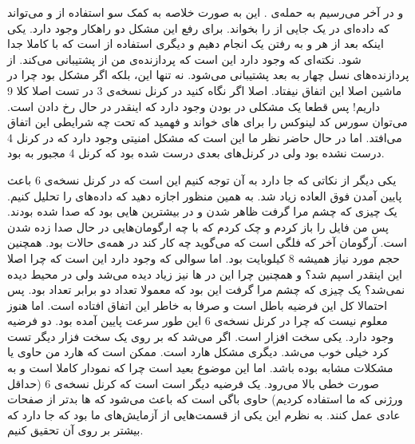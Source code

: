 و در آخر می‌رسیم به حمله‌ی
.
این به صورت خلاصه به کمک سو استفاده از
 و 
می‌تواند که داده‌ای در یک جایی از
را بخواند. برای رفع این مشکل دو راهکار وجود دارد. یکی اینکه بعد از هر
 و  به 
رفتن یک
انجام دهیم و دیگری استفاده از
است که
 با 
کاملا جدا شود. نکته‌ای که وجود دارد این است که پردازنده‌ی من از
پشتیبانی می‌کند.
از پردازنده‌های نسل چهار به بعد پشتیبانی می‌شود. نه تنها این، بلکه اگر مشکل
بود چرا در ماشین
اصلا این اتفاق نیفتاد. اصلا اگر نگاه کنید در کرنل نسخه‌ی 3 در تست
اصلا کلا 9
داریم! پس قطعا یک مشکلی در
بودن وجود دارد که اینقدر
در حال رخ دادن است. می‌توان سورس کد لینوکس را برای
های 
خواند و فهمید که تحت چه شرایطی این اتفاق می‌افتد. اما در حال حاضر نظر ما این است که مشکل امنیتی
وجود دارد که در کرنل 4 درست نشده بود ولی در کرنل‌های بعدی درست شده بود که کرنل 4 مجبور به
بود.

یکی دیگر از نکاتی که جا دارد به آن توجه کنیم این است که
در کرنل نسخه‌ی 6 باعث پایین آمدن فوق العاده زیاد
شد. به همین منظور اجازه دهید که داده‌های
را تحلیل کنیم. یک چیزی که چشم مرا گرفت ظاهر شدن
 و 
در بیشترین
هایی
بود که صدا شده بودند. پس من فایل
را باز کردم و چک کردم که
با چه ارگومان‌هایی در حال صدا زده شدن است. آرگومان آخر که فلگی است که می‌گوید چه کار کند در همه‌ی حالات
بود. همچنین حجم
مورد نیاز همیشه 8 کیلوبایت بود. اما سوالی که وجود دارد این است که چرا اصلا این
اینقدر اسپم شد؟ و همچنین چرا این
در
ها
نیز زیاد دیده می‌شد ولی در محیط
دیده نمی‌شد؟ یک چیزی که چشم مرا گرفت این بود که معمولا تعداد
دو برابر تعداد
بود. پس احتمالا کل این فرضیه باطل است و صرفا به خاطر
این اتفاق افتاده است. اما هنوز معلوم نیست که چرا در کرنل نسخه‌ی 6 این طور سرعت پایین آمده بود.
دو فرضیه وجود دارد. یکی سخت افزار است. اگر می‌شد که بر روی یک سخت فزار دیگر تست کرد خیلی خوب می‌شد.
دیگری مشکل هارد است. ممکن است که هارد من حاوی
یا مشکلات مشابه بوده باشد. اما این موضوع بعید است چرا که نمودار کاملا
است و به صورت خطی بالا می‌رود. یک فرضیه دیگر است است که کرنل نسخه‌ی 6
(حداقل ورژنی که ما استفاده کردیم)
حاوی باگی است که باعث می‌شود که
ها
بدتر از صفحات عادی عمل کنند. به نظرم این یکی از قسمت‌هایی از آزمایش‌های ما بود که جا دارد که بیشتر
بر روی آن تحقیق کنیم.

